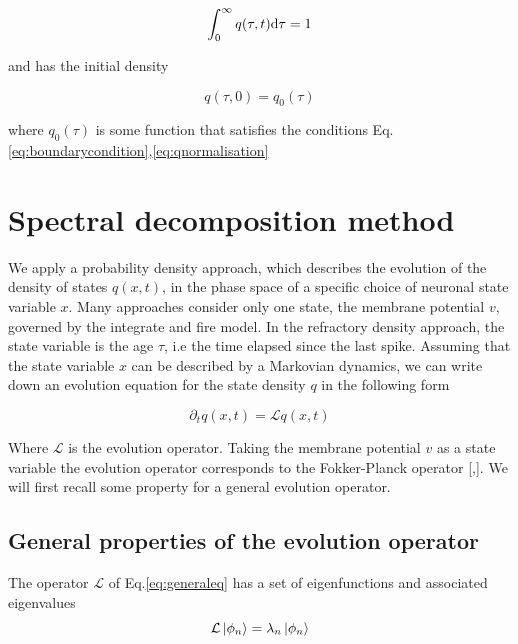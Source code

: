 \documentclass[12pt,twoside]{report}
\def \dd  {{\rm d}}
\begin{document}
\begin{equation}
\label{eq:qnormalisation}
\int_0^\infty q(\tau,t)\dd \tau = 1
\end{equation}

and has the initial density

\begin{equation}
\label{eq:qinitial}
q(\tau,0)=q_0(\tau)
\end{equation}

where $q_0(\tau)$ is some function that satisfies the conditions Eq.\eqref{eq:boundarycondition},\eqref{eq:qnormalisation}






\section{Spectral decomposition method}
\label{sec:spect}


We apply a probability density approach, which describes the evolution of the density of states $q(x,t)$, in the phase space of a specific choice of neuronal state variable $x$.
Many approaches consider only one state, the membrane potential $v$, governed by the integrate and fire model. In the refractory density approach, the state variable is the age $\tau$, i.e the time elapsed since the last spike. Assuming that the state variable $x$ can be described by a Markovian dynamics, we can write down an evolution equation for the state density $q$ in the following form

\begin{equation}
\label{eq:generaleq}
\partial_t q(x,t)=\mathcal{L}q(x,t)
\end{equation}

Where $\mathcal{L}$  is the evolution operator. Taking the membrane potential $v$ as a state variable the evolution operator corresponds to the Fokker-Planck operator [\cite{MatGiu02},\cite{SchOst13}]. We will first recall some property for a general evolution operator.



\subsection{General properties of the evolution operator}
The operator $\mathcal{L}$ of Eq.\ref{eq:generaleq} has a set of eigenfunctions and associated eigenvalues
\begin{equation}
\label{eq:fokkerplanckoperator}
\mathcal{L}\ket{\phi_n}=\lambda_n\ket{\phi_n}
\end{equation}
\end{document}
